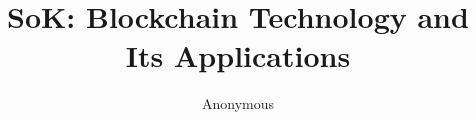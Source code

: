\documentclass[10pt, conference, compsocconf]{IEEEtran}
\begin{document}
\title{SoK: Blockchain Technology and Its Applications}
\author{Anonymous}
\maketitle



\IEEEpeerreviewmaketitle
\thispagestyle{plain}
\pagestyle{plain}














\nocite{*}

\end{document}

